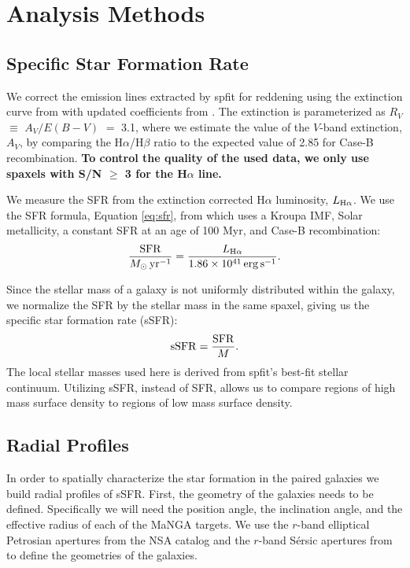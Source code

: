 \documentclass[iop,revtex4,twocolumn,apj,numberedappendix,appendixfloats]{emulateapj}
\begin{document}
\section{Analysis Methods}\label{sec:analysis}

\subsection{Specific Star Formation Rate}

We correct the emission lines extracted by {\sc spfit} for reddening using the extinction curve from \citet{Cardelli:1989} with updated coefficients from \citet{ODonnell:1994}. The extinction is parameterized as $R_V$ $\equiv$ $A_V/E(B-V)$ $=$ 3.1, where we estimate the value of the $V$-band extinction, $A_V$, by comparing the H$\alpha$/H$\beta$ ratio to the expected value of 2.85 for Case-B recombination. \textbf{To control the quality of the used data, we only use spaxels with S/N $\ge$ 3 for the H$\alpha$ line.}

We measure the SFR from the extinction corrected H$\alpha$ luminosity, $L_{{\rm H}\alpha}$. We use the SFR formula, Equation \ref{eq:sfr}, from \citet{Murphy:2011} which uses a Kroupa IMF, Solar metallicity, a constant SFR at an age of 100 Myr, and Case-B recombination: 
\begin{equation}\label{eq:sfr}
\frac{\rm{SFR}}{M_{\odot} \, \rm{yr^{-1}}} = \frac{L_{\rm H\alpha}}{1.86 \times 10^{41}\, \rm{erg\,s}^{-1}}.
\end{equation}

Since the stellar mass of a galaxy is not uniformly distributed within the galaxy, we normalize the SFR by the stellar mass in the same spaxel, giving us the specific star formation rate (sSFR):
\begin{equation}
{\rm sSFR} = \frac{\rm SFR}{M}.
\end{equation}
The local stellar masses used here is derived from {\sc spfit}'s best-fit stellar continuum. Utilizing sSFR, instead of SFR, allows us to compare regions of high mass surface density to regions of low mass surface density. 

\subsection{Radial Profiles}\label{sec:radial}

In order to spatially characterize the star formation in the paired galaxies we build radial profiles of sSFR. First, the geometry of the galaxies needs to be defined. Specifically we will need the position angle, the inclination angle, and the effective radius of each of the MaNGA targets. We use the $r$-band elliptical Petrosian apertures from the NSA catalog and the $r$-band S\'ersic apertures from \citet{Simard:2011} to define the geometries of the galaxies. 
\end{document}

